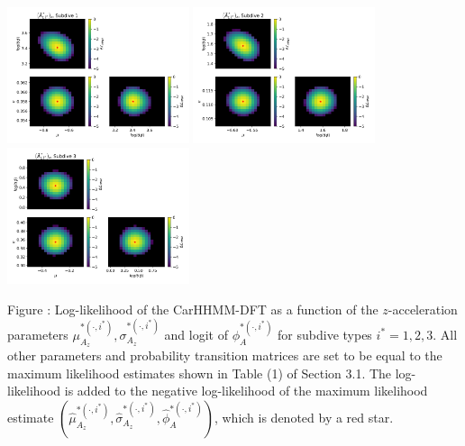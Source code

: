 \documentclass{article}
\begin{document}
        \begin{center}
        \includegraphics[width=2.1in]{../Plots/2019/20190902-182840-CATs_OB_1_0_267_CarHHMM2_fine-theta-likelihood-Az-0.png}
        \includegraphics[width=2.1in]{../Plots/2019/20190902-182840-CATs_OB_1_0_267_CarHHMM2_fine-theta-likelihood-Az-1.png}
        \includegraphics[width=2.1in]{../Plots/2019/20190902-182840-CATs_OB_1_0_267_CarHHMM2_fine-theta-likelihood-Az-2.png}
        \end{center}
        
        \noindent Figure : Log-likelihood of the CarHHMM-DFT as a function of the $z$-acceleration parameters $\mu_{A_z}^{*(\cdot,i^*)}, \sigma_{A_z}^{*(\cdot,i^*)}$ and logit of $\phi_{A}^{*(\cdot,i^*)}$ for subdive types $i^* = 1,2,3$. All other parameters and probability transition matrices are set to be equal to the maximum likelihood estimates shown in Table (1) of Section 3.1. The log-likelihood is added to the negative log-likelihood of the maximum likelihood estimate $(\hat \mu_{A_z}^{*(\cdot,i^*)}, \hat \sigma_{A_z}^{*(\cdot,i^*)}, \hat \phi_{A}^{*(\cdot,i^*)})$, which is denoted by a red star.
        \addtocounter{fignum}{1}
        
        \newpage
        
\end{document}

